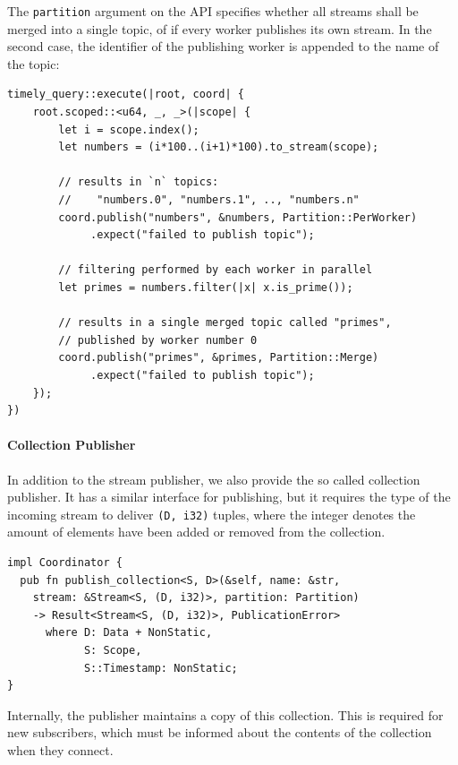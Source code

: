 The \lstinline{partition} argument on the API specifies whether all streams
shall be merged into a single topic, of if every worker publishes its own stream.
In the second case, the identifier of the publishing worker is appended to the
name of the topic:

\begin{lstlisting}[caption={
Example use of publisher.
}]
timely_query::execute(|root, coord| {
    root.scoped::<u64, _, _>(|scope| {
        let i = scope.index();
        let numbers = (i*100..(i+1)*100).to_stream(scope);

        // results in `n` topics:
        //    "numbers.0", "numbers.1", .., "numbers.n"
        coord.publish("numbers", &numbers, Partition::PerWorker)
             .expect("failed to publish topic");

        // filtering performed by each worker in parallel
        let primes = numbers.filter(|x| x.is_prime());

        // results in a single merged topic called "primes",
        // published by worker number 0
        coord.publish("primes", &primes, Partition::Merge)
             .expect("failed to publish topic");
    });
})
\end{lstlisting}


\paragraph{Collection Publisher}

In addition to the stream publisher, we also provide the so called collection
publisher. It has a similar interface for publishing, but it requires the
type of the incoming stream to deliver \lstinline{(D, i32)} tuples, where
the integer denotes the amount of elements have been added or removed from
the collection.

\begin{lstlisting}[caption={[Collection publisher interface]
}]
impl Coordinator {
  pub fn publish_collection<S, D>(&self, name: &str,
    stream: &Stream<S, (D, i32)>, partition: Partition)
    -> Result<Stream<S, (D, i32)>, PublicationError>
      where D: Data + NonStatic, 
            S: Scope,
            S::Timestamp: NonStatic;
}
\end{lstlisting}

Internally, the publisher maintains a copy of this collection. This is required
for new subscribers, which must be informed about the contents of the collection
when they connect.

